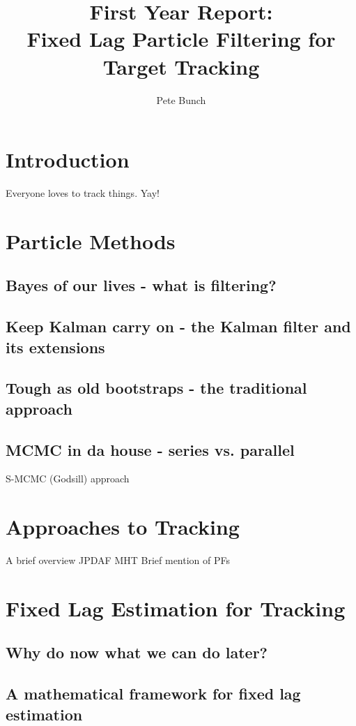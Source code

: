 \documentclass{RJWThesis}
\title{First Year Report: \\ Fixed Lag Particle Filtering for Target Tracking}
\author{Pete Bunch}
\begin{document}
\maketitle
\tableofcontents

\chapter{Introduction}
Everyone loves to track things. Yay! 

\chapter{Particle Methods} \label{chap:basics}
\section{Bayes of our lives - what is filtering?}


\section{Keep Kalman carry on - the Kalman filter and its extensions}


\section{Tough as old bootstraps - the traditional approach}


\section{MCMC in da house - series vs. parallel}
S-MCMC (Godsill) approach


\chapter{Approaches to Tracking}
A brief overview
JPDAF
MHT
Brief mention of PFs


\chapter{Fixed Lag Estimation for Tracking}
\section{Why do now what we can do later?}


\section{A mathematical framework for fixed lag estimation}

\end{document}
